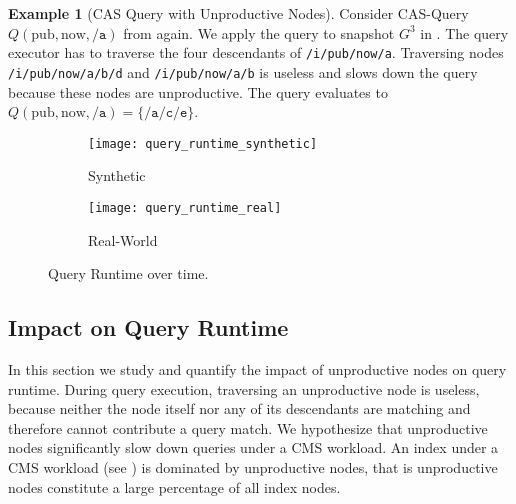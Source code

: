 \documentclass[abstracton,12pt]{scrartcl}
\theoremstyle{definition}
\newtheorem{example}{Example}
\begin{document}
\begin{example}[CAS Query with Unproductive Nodes]
  Consider CAS-Query $Q(\text{pub},\text{now},\texttt{/a})$ from
   again. We apply the query to snapshot $G^3$ in
  . The query executor has to traverse the four
  descendants of \texttt{/i/pub/now/a}. Traversing nodes
  \texttt{/i/pub/now/a/b/d} and \texttt{/i/pub/now/a/b} is useless and slows down the
  query because these nodes are unproductive. The query evaluates to
  $Q(\text{pub},\text{now},\texttt{/a}) = \{\texttt{/a/c/e}\}$.
\end{example}

\newpage

\begin{figure}[H]
  \centering
  \begin{subfigure}{0.49\linewidth}
    \centering
    \caption{Synthetic}
    \texttt{[image: query\_runtime\_synthetic]}
    \label{fig:query_runtime_synthetic}
  \end{subfigure}
  \begin{subfigure}{0.49\linewidth}
    \centering
    \caption{Real-World}
    \texttt{[image: query\_runtime\_real]}
    \label{fig:query_runtime_real}
  \end{subfigure}
  \vspace{-0.5cm}
  \caption{Query Runtime over time.}
  \label{fig:query_runtime}
\end{figure}

\subsection{Impact on Query Runtime}

\label{sec:query-runtime}

In this section we study and quantify the impact of unproductive nodes on
query runtime. During query execution, traversing an unproductive node is
useless, because neither the node itself nor any of its descendants are matching
and therefore cannot contribute a query match. We hypothesize that unproductive nodes
significantly slow down queries under a CMS workload.
An index under a CMS workload (see ) is dominated
by unproductive nodes, that is unproductive nodes constitute a large percentage
of all index nodes.


\end{document}
